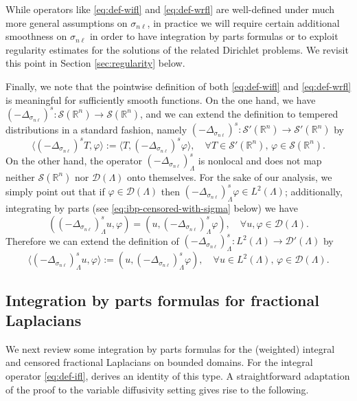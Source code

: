 \documentclass{amsart}
\newcommand{\domain}{\Lambda}
\newcommand{\snl}{{\sigma_{n\ell}}}
\def\calD{\mathcal{D}}
\def\calS{\mathcal{S}}
\def\rn{{{\mathbb R}^n}}
\newcommand{\phii}{{\varphi}}
\theoremstyle{plain}
\numberwithin{equation}{section}
\numberwithin{table}{section}
\numberwithin{figure}{section}
\numberwithin{theorem}{section}
\numberwithin{corollary}{section}
\numberwithin{definition}{section}
\numberwithin{lemma}{section}
\numberwithin{proposition}{section}
\numberwithin{remark}{section}
\begin{document}
While operators like \eqref{eq:def-wifl} and \eqref{eq:def-wrfl} are well-defined under much more general assumptions on $\snl$, in practice we will require certain additional smoothness on $\snl$ in order to have integration by parts formulas or to exploit regularity estimates for the solutions of the related Dirichlet problems. We revisit this point in Section \ref{sec:regularity} below.

Finally, we note that the pointwise definition of both \eqref{eq:def-wifl} and \eqref{eq:def-wrfl} is meaningful for sufficiently smooth functions. 
On the one hand, we have $(-\Delta_\snl)^s : \calS(\rn) \to \calS(\rn)$, and we can extend the definition to tempered distributions in a standard fashion, namely $(-\Delta_\snl)^s : \calS'(\rn) \to \calS'(\rn)$ by
\[
\langle (-\Delta_\snl)^s T , \phii \rangle := \langle T , (-\Delta_\snl)^s  \phii \rangle, \quad \forall T \in \calS'(\rn), \, \phii \in \calS(\rn).
\]
On the other hand, the operator $(-\Delta_\snl)^s_\domain$ is nonlocal and does not map neither $ \calS(\rn) $ nor $\calD(\domain)$ onto themselves. For the sake of our analysis, we simply point out that if $ \phii \in \calD(\domain)$ then $(-\Delta_\snl)^s_\domain \phii \in L^2(\domain)$; additionally, integrating by parts (see \eqref{eq:ibp-censored-with-sigma} below) we have
\[
( (-\Delta_\snl)^s_\domain u , \phii ) = (u , (-\Delta_\snl)^s_\domain  \phii ), \quad \forall u , \phii \in \calD(\domain).
\]
Therefore we can extend the definition of  $(-\Delta_\snl)^s_\domain \colon L^2(\domain) \to \calD'(\domain)$ by
\begin{equation} \label{eq:def-delta_domain-dist}
\langle (-\Delta_\snl)^s_\domain u , \phii \rangle := (u , (-\Delta_\snl)^s_\domain  \phii ), \quad \forall u \in L^2(\domain), \, \phii \in \calD(\domain).
\end{equation}

\subsection{Integration by parts formulas for fractional Laplacians}
We next review some integration by parts formulas for the (weighted) integral and censored fractional Laplacians on bounded domains. For the integral operator \eqref{eq:def-ifl}, \cite[Lemma 3.3]{DiRoVa17} derives an identity of this type. A straightforward adaptation of the proof to the variable diffusivity setting gives rise to the following.
\end{document}
